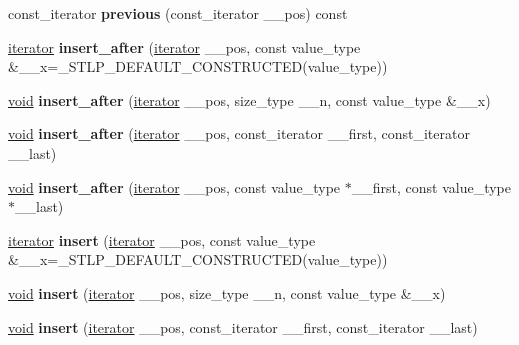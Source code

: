 \begin{DoxyCompactItemize}
const\+\_\+iterator {\bfseries previous} (const\+\_\+iterator \+\_\+\+\_\+pos) const
\item 
\mbox{\label{classslist_ab5625aa3bee686b3e7fdc3ebf74ae16f}} 
\hyperlink{structiterator}{iterator} {\bfseries insert\+\_\+after} (\hyperlink{structiterator}{iterator} \+\_\+\+\_\+pos, const value\+\_\+type \&\+\_\+\+\_\+x=\+\_\+\+S\+T\+L\+P\+\_\+\+D\+E\+F\+A\+U\+L\+T\+\_\+\+C\+O\+N\+S\+T\+R\+U\+C\+T\+ED(value\+\_\+type))
\item 
\mbox{\label{classslist_aa98831e0d2cbbc18559a4aa76bee1c1e}} 
\hyperlink{interfacevoid}{void} {\bfseries insert\+\_\+after} (\hyperlink{structiterator}{iterator} \+\_\+\+\_\+pos, size\+\_\+type \+\_\+\+\_\+n, const value\+\_\+type \&\+\_\+\+\_\+x)
\item 
\mbox{\label{classslist_ac48f0ea37816ca850d418cd17400c275}} 
\hyperlink{interfacevoid}{void} {\bfseries insert\+\_\+after} (\hyperlink{structiterator}{iterator} \+\_\+\+\_\+pos, const\+\_\+iterator \+\_\+\+\_\+first, const\+\_\+iterator \+\_\+\+\_\+last)
\item 
\mbox{\label{classslist_a5ec7ba3a0ba98e46ffea1f26fa6b7120}} 
\hyperlink{interfacevoid}{void} {\bfseries insert\+\_\+after} (\hyperlink{structiterator}{iterator} \+\_\+\+\_\+pos, const value\+\_\+type $\ast$\+\_\+\+\_\+first, const value\+\_\+type $\ast$\+\_\+\+\_\+last)
\item 
\mbox{\label{classslist_a545d584c35667104893d7ab24e89feb2}} 
\hyperlink{structiterator}{iterator} {\bfseries insert} (\hyperlink{structiterator}{iterator} \+\_\+\+\_\+pos, const value\+\_\+type \&\+\_\+\+\_\+x=\+\_\+\+S\+T\+L\+P\+\_\+\+D\+E\+F\+A\+U\+L\+T\+\_\+\+C\+O\+N\+S\+T\+R\+U\+C\+T\+ED(value\+\_\+type))
\item 
\mbox{\label{classslist_acc1b8600d4a9839c3465dc228bdbee2c}} 
\hyperlink{interfacevoid}{void} {\bfseries insert} (\hyperlink{structiterator}{iterator} \+\_\+\+\_\+pos, size\+\_\+type \+\_\+\+\_\+n, const value\+\_\+type \&\+\_\+\+\_\+x)
\item 
\mbox{\label{classslist_a0afd5a869869cd7062ec22f805b9d63f}} 
\hyperlink{interfacevoid}{void} {\bfseries insert} (\hyperlink{structiterator}{iterator} \+\_\+\+\_\+pos, const\+\_\+iterator \+\_\+\+\_\+first, const\+\_\+iterator \+\_\+\+\_\+last)

\end{DoxyCompactItemize}
